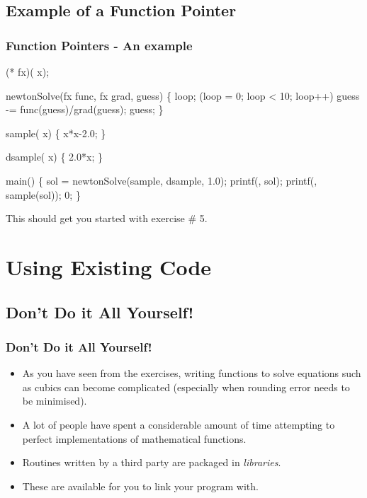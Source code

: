 \documentclass[smaller,handout,table]{beamer}
\begin{document}
\subsection{Example of a Function Pointer}
\begin{frame}[fragile]
\frametitle{Function Pointers - An example}
\vspace{-0.2in}
\begin{semiverbatim}
\tiny
{} 
 (* fx)( x);

 newtonSolve(fx func, fx grad,  guess)
\{
    loop;
    (loop = 0; loop < 10; loop++) guess -= func(guess)/grad(guess);
    guess;
\}

 sample( x)
\{
    x*x-2.0;
\}

 dsample( x)
\{
    2.0*x;
\}

 main()
\{
    sol = newtonSolve(sample, dsample, 1.0);
   printf(, sol);     
   printf(, sample(sol));
    0;
\}
\end{semiverbatim}
This should get you started with exercise \# 5.
\end{frame}

\section{Using Existing Code}
\subsection{Don't Do it All Yourself!}
\begin{frame}
\frametitle{Don't Do it All Yourself!}
\begin{itemize}
\item As you have seen from the exercises, writing functions to solve equations such as cubics can become complicated (especially when rounding error needs to be minimised).
\item A lot of people have spent a considerable amount of time attempting to perfect implementations of mathematical functions.
\item Routines written by a third party are packaged in \emph{libraries}.
\item These are available for you to link your program with.
\end{itemize}
\end{frame}
\end{document}

